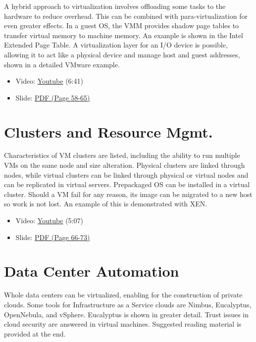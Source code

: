 A hybrid approach to virtualization involves offloading some tasks to
the hardware to reduce overhead. This can be combined with
para-virtualization for even greater effects. In a guest OS, the VMM
provides shadow page tables to transfer virtual memory to machine
memory. An example is shown in the Intel Extended Page Table. A
virtualization layer for an I/O device is possible, allowing it to act
like a physical device and manage host and guest addresses, shown in a
detailed VMware example.

\begin{itemize}

\item
  Video: \href{https://www.youtube.com/watch?v=I_J4eUUavSY}{Youtube}
  (6:41)
\item
  Slide:
  \href{https://drive.google.com/open?id=0B88HKpainTSfQU1uQmxZWHdWQ1k}{PDF
  (Page 58-65)}
\end{itemize}

\section{Clusters and Resource
Mgmt.}\label{clusters-and-resource-mgmt.}

Characteristics of VM clusters are listed, including the ability to run
multiple VMs on the same node and size alteration. Physical clusters are
linked through nodes, while virtual clusters can be linked through
physical or virtual nodes and can be replicated in virtual servers.
Prepackaged OS can be installed in a virtual cluster. Should a VM fail
for any reason, its image can be migrated to a new host so work is not
lost. An example of this is demonstrated with XEN.

\begin{itemize}

\item
  Video: \href{https://www.youtube.com/watch?v=Mn9pgGtFy4g}{Youtube}
  (5:07)
\item
  Slide:
  \href{https://drive.google.com/open?id=0B88HKpainTSfQU1uQmxZWHdWQ1k}{PDF
  (Page 66-73)}
\end{itemize}

\section{Data Center Automation}\label{data-center-automation}

Whole data centers can be virtualized, enabling for the construction of
private clouds. Some tools for Infrastructure as a Service clouds are
Nimbus, Eucalyptus, OpenNebula, and vSphere. Eucalyptus is shown in
greater detail. Trust issues in cloud security are answered in virtual
machines. Suggested reading material is provided at the end.

